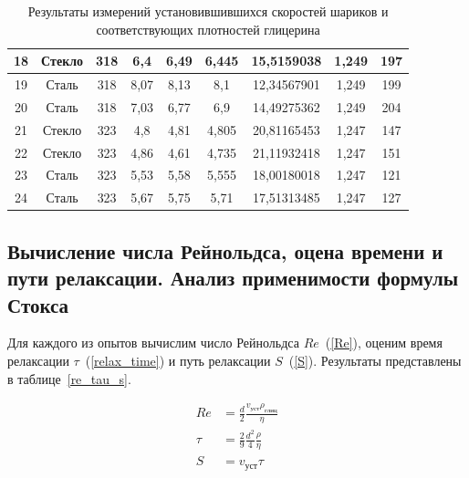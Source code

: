 \documentclass[a4paper, 12pt]{article}
\begin{document}
\begin{table}[!ht]
\begin{tabular}{|c|c|c|c|c|c|c|c|c|}
            18 & Стекло & 318 & 6,4 & 6,49 & 6,445 & 15,5159038 & 1,249  & 197  \\ \hline
            19 & Сталь & 318 & 8,07 & 8,13 & 8,1 & 12,34567901 & 1,249  & 199  \\ \hline
            20 & Сталь & 318 & 7,03 & 6,77 & 6,9 & 14,49275362 & 1,249  & 204  \\ \hline
            21 & Стекло & 323 & 4,8 & 4,81 & 4,805 & 20,81165453 & 1,247  & 147  \\ \hline
            22 & Стекло & 323 & 4,86 & 4,61 & 4,735 & 21,11932418 & 1,247  & 151  \\ \hline
            23 & Сталь & 323 & 5,53 & 5,58 & 5,555 & 18,00180018 & 1,247  & 121  \\ \hline
            24 & Сталь & 323 & 5,67 & 5,75 & 5,71 & 17,51313485 & 1,247  & 127  \\ \hline
        \end{tabular}
        \caption{Результаты измерений установившившихся скоростей шариков и соответствующих плотностей глицерина}
        \label{velocities}
    \end{table}

    \subsection{Вычисление числа Рейнольдса, оцена времени и пути релаксации. Анализ применимости формулы Стокса}

    Для каждого из опытов вычислим число Рейнольдса $Re$~(\ref{Re}), оценим время релаксации $\tau$~(\ref{relax_time}) и путь релаксации $S$~(\ref{S}). Результаты представлены в таблице~\ref{re_tau_s}.

    \begin{align}
        Re &= \frac{d}{2} \frac{v_{уст} \rho_{глиц}}{\eta} \label{Re}\\
        \tau &= \frac{2}{9} \frac{d^2}{4} \frac{\rho}{\eta} \label{relax_time}\\
        S &= v_{уст} \tau \label{S}
    \end{align}
\end{document}
